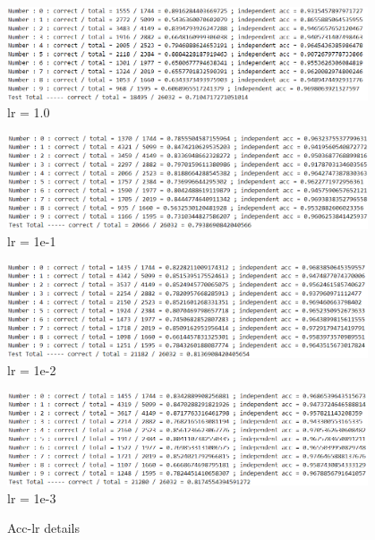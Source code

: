 \documentclass{article}
\begin{document}
\begin{figure}[H]
    \centering
    \begin{minipage}{0.48\textwidth}
        \centering
        \includegraphics[width=0.95\textwidth]{fig/4-4.png}\\
        lr = 1.0
    \end{minipage}
    \begin{minipage}{0.48\textwidth}
        \centering
        \includegraphics[width=0.95\textwidth]{fig/4-3.png}\\
        lr = 1e-1
    \end{minipage}
    \begin{minipage}{0.48\textwidth}
        \centering
        \includegraphics[width=0.95\textwidth]{fig/4-2.png}\\
        lr = 1e-2
    \end{minipage}
    \begin{minipage}{0.48\textwidth}
        \centering
        \includegraphics[width=0.95\textwidth]{fig/4-1.png}\\
        lr = 1e-3
    \end{minipage}
    \caption{Acc-lr details}
    \label{lracclrfig}
\end{figure}
\end{document}
